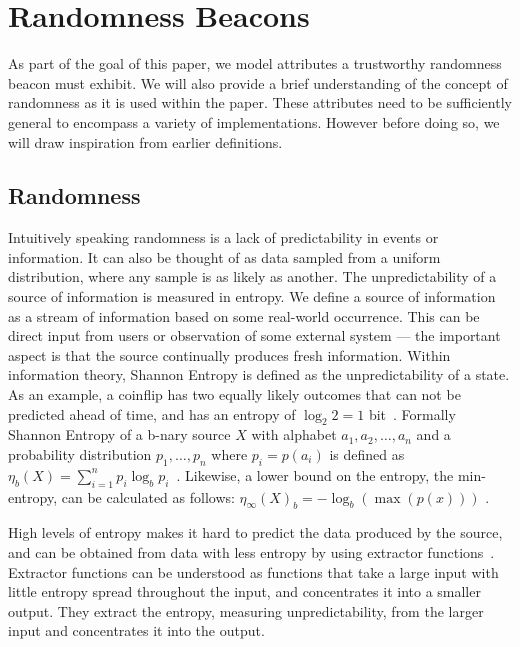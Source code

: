 \section{Randomness Beacons}\label{sec:beacons}

As part of the goal of this paper, we model attributes a trustworthy randomness beacon must exhibit.
We will also provide a brief understanding of the concept of randomness as it is used within the paper. 
These attributes need to be sufficiently general to encompass a variety of implementations.
However before doing so, we will draw inspiration from earlier definitions.

\subsection{Randomness}\label{sub:beacons_randomness}

Intuitively speaking randomness is a lack of predictability in events or information. It can also be thought of as data sampled from a uniform distribution, where any sample is as likely as another. The unpredictability of a source of information is measured in entropy.
We define a source of information as a stream of information based on some real-world occurrence. This can be direct input from users or observation of some external system --- the important aspect is that the source continually produces fresh information.  
Within information theory, Shannon Entropy is defined as the unpredictability of a state. As an example, a coinflip has two equally likely outcomes that can not be predicted ahead of time, and has an entropy of $\log_{2} 2 = 1$ bit~\cite{informationtheory}. 
Formally Shannon Entropy of a b-nary source $X$ with alphabet ${a_1, a_2, \ldots, a_n}$ and a probability distribution ${p_1, \ldots , p_n}$ where $p_i = p(a_i)$ is defined as  $\eta_{b} (X) = \sum\limits_{i = 1}^n p_{i}\log_{b} p_{i}$~\cite{informationtheory}. 
Likewise, a lower bound on the entropy, the  min-entropy, can be calculated as follows: $\eta _\infty(X) _{b} = -\log_{b}(\max(p(x)))$ \cite{informationtheory} .

High levels of entropy makes it hard to predict the data produced by the source, and can be obtained from data with less entropy by using extractor functions~\cite{pseudorandomness}. Extractor functions can be understood as functions that take a large input with little entropy spread throughout the input, and concentrates it into a smaller output. They extract the entropy, measuring unpredictability, from the larger input and concentrates it into the output. 

